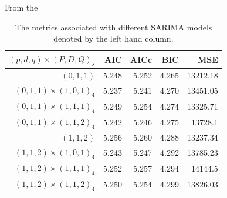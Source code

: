 \documentclass{paper}
\begin{document}
From the 
\begin{table}
\centering
\begin{tabular}{r || r | r| r| r}
$(p, d, q) \times(P, D, Q)_s$   & AIC   &AICc   &BIC    &MSE\\
\hline
$(0, 1, 1)$               & 5.248 &5.252  &4.265  &13212.18\\
$(0, 1, 1) \times (1, 0, 1)_4$   & 5.237 &5.241  &4.270  &13451.05\\ %
$(0, 1, 1) \times (1, 1, 1)_4$   & 5.249 &5.254  &4.274  &13325.71\\
$(0, 1, 1) \times (1, 1, 2)_4$   & 5.242 &5.246  &4.275  &13728.1\\
\hline
$(1, 1, 2)$               & 5.256 & 5.260 &4.288  &13237.34\\
$(1, 1, 2) \times (1, 0, 1)_4$   & 5.243 &5.247  &4.292  &13785.23\\ %
$(1, 1, 2) \times (1, 1, 1)_4$   & 5.252 & 5.257 &4.294  &14144.5\\
$(1, 1, 2)\times (1, 1, 2)_4$   & 5.250 & 5.254 & 4.299 &13826.03
\end{tabular}
\caption{The metrics associated with different SARIMA models denoted by the left hand column.}
\end{table}

\end{document}
